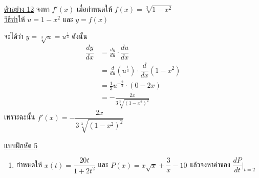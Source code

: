 \documentclass[hidelinks,12pt,a4paper]{article}
\newcommand{\s}{\space}
\newcommand{\qed}{\scalebox{0.8}{$\blacksquare$}}
\newcommand{\nr}[2]{\sqrt[#1]{#2}}
\newcommand{\ddx}{\dfrac{d}{dx}}
\newcommand{\dx}[1]{\dfrac{d#1}{dx}}
\begin{document}
\vspace{2mm}
\underline{ตัวอย่าง 12} จงหา $f'(x)$ เมื่อกำหนดให้ $f(x)=\nr{3}{1-x^2}$ \\[1ex]
\underline{\underline{วิธีทำ}}\hspace{8mm}ให้ $u=1-x^2$ และ $y=f(x)$

\hspace{15mm} จะได้ว่า $y=\nr{3}{u}=u^{\scriptscriptstyle \frac{1}{3}}$ \s ดังนั้น
\begin{align*}
    \dx{y} & = \frac{dy}{du}\cdot\dx{u} \\[0.5ex]
    & = \frac{d}{du}(u^{\scriptscriptstyle \frac{1}{3}})\cdot \ddx (1-x^2) \\[0.5ex]
    & = \frac{1}{3}u^{\scriptscriptstyle -\frac{2}{3}}\cdot (0-2x) \\[0.5ex]
    & = -\frac{2x}{3\nr{3}{(1-x^2)^2}}
\end{align*}
\hspace{15mm} เพราะฉะนั้น $f'(x)=-\dfrac{2x}{3\nr{3}{(1-x^2)^2}}$ \hfill\qed

\vspace{2mm}
\underline{\large แบบฝึกหัด 5}
\begin{enumerate}
    \item กำหนดให้ $x(t)=\dfrac{20t}{1+2t^2}$ และ $P(x)=x\sqrt{x}+\dfrac{3}{x}-10$ \s แล้วจงหาค่าของ $\dfrac{dP}{dt}\bigg|_{t=2}$
\end{enumerate}
\newpage
\end{document}
